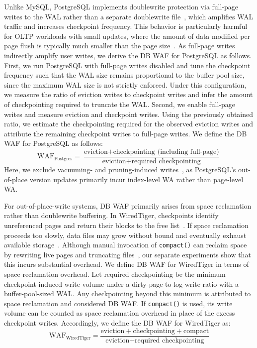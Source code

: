 Unlike MySQL, PostgreSQL implements doublewrite protection via full-page writes to the WAL rather than a separate doublewrite file~\cite{postgresql/doc/dwb},
which amplifies WAL traffic and increases checkpoint frequency.
This behavior is particularly harmful for OLTP workloads with small updates, where the amount of data modified per page flush is typically much smaller than the page size~\cite{nvppl}.
As full-page writes indirectly amplify user writes, we derive the DB WAF for PostgreSQL as follows.
First, we run PostgreSQL with full-page writes disabled and tune the checkpoint frequency such that the WAL size remains proportional to the buffer pool size, since the maximum WAL size is not strictly enforced.
Under this configuration, we measure the ratio of eviction writes to checkpoint writes and infer the amount of checkpointing required to truncate the WAL.
Second, we enable full-page writes and measure eviction and checkpoint writes.
Using the previously obtained ratio, we estimate the checkpointing required for the observed eviction writes and attribute the remaining checkpoint writes to full-page writes.
We define the DB WAF for PostgreSQL as follows:
\[
\text{WAF}_{\text{Postgres}} =
\frac{\text{eviction} + \text{checkpointing (including full-page)}}
     {\text{eviction} + \text{required checkpointing}}
\]
Here, we exclude vacuuming- and pruning-induced writes~\cite{PostgreSQLDoc}, as PostgreSQL’s out-of-place version updates primarily incur index-level WA rather than page-level WA.

For out-of-place-write systems, DB WAF primarily arises from space reclamation rather than doublewrite buffering.
In WiredTiger, checkpoints identify unreferenced pages and return their blocks to the free list~\cite{WiredTiger_Checkpoint_Arch}.
If space reclamation proceeds too slowly, data files may grow without bound and eventually exhaust available storage~\cite{MongoDB_WiredTiger_DataSize_Increase_2021}.
Although manual invocation of \texttt{compact()} can reclaim space by rewriting live pages and truncating files~\cite{wiredtiger-compaction}, our separate experiments show that this incurs substantial overhead.
We define DB WAF for WiredTiger in terms of space reclamation overhead.
Let required checkpointing be the minimum checkpoint-induced write volume under a dirty-page-to-log-write ratio with a buffer-pool-sized WAL.
Any checkpointing beyond this minimum is attributed to space reclamation and considered DB WAF.
If \texttt{compact()} is used, its write volume can be counted as space reclamation overhead in place of the excess checkpoint writes.
Accordingly, we define the DB WAF for WiredTiger as:
\[
\text{WAF}_{\text{WiredTiger}} =
\frac{\text{eviction} + \text{checkpointing} + \text{compact}}
     {\text{eviction} + \text{required checkpointing}}
\]


